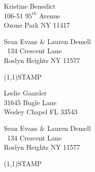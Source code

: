 \documentclass[12pt]{article}
\begin{document}
\begin{center} \begin{Huge} \vspace*{\fill}
Kristine Benedict\\
106-51 $95^{th}$ Avenue\\
Ozone Park NY 11417\\
\vspace{\fill} \end{Huge} \end{center}

\clearpage

\begin{minipage}{.5\linewidth} \noindent
Sean Evans \& Lauren Demell\\\ 
134 Crescent Lane\\ 
Roslyn Heights NY 11577
\end{minipage}
\begin{minipage}{.5\linewidth \hspace{-.2in} \vspace{-.3in}}
\begin{flushright}
\framebox(1,1){STAMP}
\end{flushright}
\end{minipage}

\begin{center} \begin{Huge} \vspace*{\fill}
Leslie Gaarder\\
31645 Bugle Lane\\
Wesley Chapel FL 33543\\
\vspace{\fill} \end{Huge} \end{center}

\clearpage

\begin{minipage}{.5\linewidth} \noindent
Sean Evans \& Lauren Demell\\\ 
134 Crescent Lane\\ 
Roslyn Heights NY 11577
\end{minipage}
\begin{minipage}{.5\linewidth \hspace{-.2in} \vspace{-.3in}}
\begin{flushright}
\framebox(1,1){STAMP}
\end{flushright}
\end{minipage}
\end{document}
